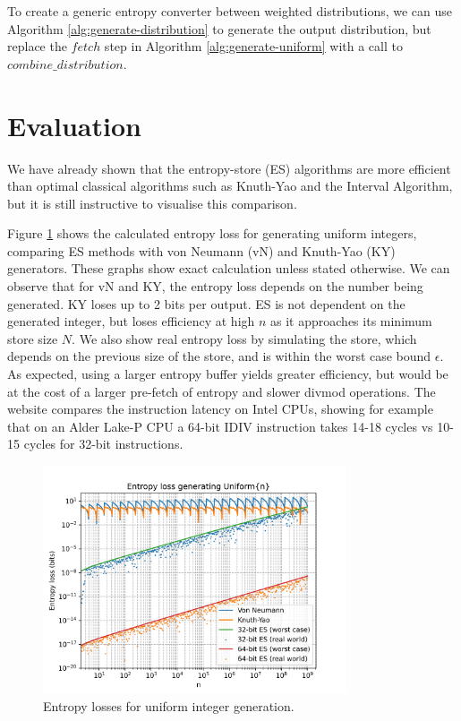 \documentclass[12pt]{article}
\begin{document}
To create a generic entropy converter between weighted distributions, we can use Algorithm \ref{alg:generate-distribution} to generate the output distribution, but replace the $fetch$ step in Algorithm \ref{alg:generate-uniform} with a call to $combine\_distribution$.





\section {Evaluation}

We have already shown that the entropy-store (ES) algorithms are more efficient than optimal classical algorithms such as Knuth-Yao and the Interval Algorithm, but it is still instructive to visualise this comparison.

Figure \ref{fig:uniform-losses} shows the calculated entropy loss for generating uniform integers, comparing ES methods with von Neumann (vN) and Knuth-Yao (KY) generators. These graphs show exact calculation unless stated otherwise. We can observe that for vN and KY, the entropy loss depends on the number being generated. KY loses up to 2 bits per output. ES is not dependent on the generated integer, but loses efficiency at high $n$ as it approaches its minimum store size $N$. We also show real entropy loss by simulating the store, which depends on the previous size of the store, and is within the worst case bound $\epsilon$. As expected, using a larger entropy buffer yields greater efficiency, but would be at the cost of a larger pre-fetch of entropy and slower divmod operations. The \cite{Abel19a} website compares the instruction latency on Intel CPUs, showing for example that on an Alder Lake-P CPU a 64-bit IDIV instruction takes 14-18 cycles vs 10-15 cycles for 32-bit instructions.

\begin{figure}[ht]
\centering
\includegraphics[width=0.8\textwidth]{uniform_losses.png}
\caption{Entropy losses for uniform integer generation.}
\label{fig:uniform-losses}
\end{figure}
\end{document}
